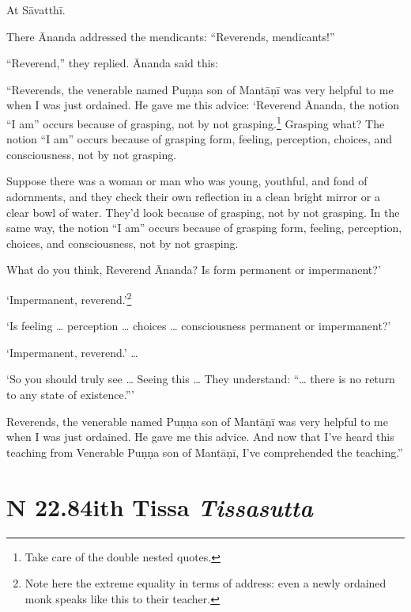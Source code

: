 \documentclass[12pt,openany]{book}%
\newcommand*{\suttatitleacronym}[1]{\smaller[2]{#1}\vspace*{.3em}}
\newcommand*{\suttatitletranslation}[1]{\linebreak{#1}}
\newcommand*{\suttatitleroot}[1]{\linebreak\smaller[2]\itshape{#1}}
\newcommand*{\tocacronym}[1]{\hspace*{-3.3em}{#1}\quad}
\newcommand*{\toctranslation}[1]{#1}
\newcommand*{\tocroot}[1]{(\textit{#1})}
\begin{document}
At \textsanskrit{Sāvatthī}. 

There Ānanda addressed the mendicants: “Reverends, mendicants!” 

“Reverend,” they replied. Ānanda said this: 

“Reverends, the venerable named \textsanskrit{Puṇṇa} son of \textsanskrit{Mantāṇī} was very helpful to me when I was just ordained. He gave me this advice: ‘Reverend Ānanda, the notion “I am” occurs because of grasping, not by not grasping.\footnote{Take care of the double nested quotes. } Grasping what? The notion “I am” occurs because of grasping form, feeling, perception, choices, and consciousness, not by not grasping. 

Suppose there was a woman or man who was young, youthful, and fond of adornments, and they check their own reflection in a clean bright mirror or a clear bowl of water. They’d look because of grasping, not by not grasping. In the same way, the notion “I am” occurs because of grasping form, feeling, perception, choices, and consciousness, not by not grasping. 

What do you think, Reverend Ānanda? Is form permanent or impermanent?’ 

‘Impermanent, reverend.’\footnote{Note here the extreme equality in terms of address: even a newly ordained monk speaks like this to their teacher. } 

‘Is feeling … perception … choices … consciousness permanent or impermanent?’ 

‘Impermanent, reverend.’ … 

‘So you should truly see … Seeing this … They understand: “… there is no return to any state of existence.”’ 

Reverends, the venerable named \textsanskrit{Puṇṇa} son of \textsanskrit{Mantāṇī} was very helpful to me when I was just ordained. He gave me this advice. And now that I’ve heard this teaching from Venerable \textsanskrit{Puṇṇa} son of \textsanskrit{Mantāṇī}, I’ve comprehended the teaching.” 

%
\section*{{\suttatitleacronym SN 22.84}{\suttatitletranslation With Tissa }{\suttatitleroot Tissasutta}}
\addcontentsline{toc}{section}{\tocacronym{SN 22.84} \toctranslation{With Tissa } \tocroot{Tissasutta}}
\end{document}
